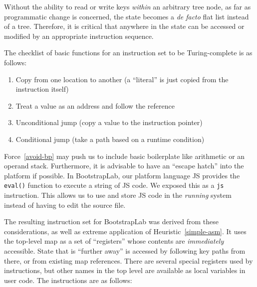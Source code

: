 \documentclass[ twoside,openright,titlepage,numbers=noenddot,headinclude,footinclude,cleardoublepage=empty,abstract=on,
                BCOR=5mm,paper=a4,fontsize=11pt
                ]{scrreprt}
\providecommand{\tightlist}{}\newenvironment{longtable}[2]{\begin{tabular}}{\end{tabular}}
\theoremstyle{definition}
\begin{document}
Without the ability to read or write keys \emph{within} an arbitrary
tree node, as far as programmatic change is concerned, the state becomes
a \emph{de facto} flat list instead of a tree. Therefore, it is critical
that anywhere in the state can be accessed or modified by an appropriate
instruction sequence.

The checklist of basic functions for an instruction set to be
Turing-complete is as follows:

\begin{enumerate}
\def\labelenumi{\arabic{enumi}.}
\tightlist
\item
  Copy from one location to another (a ``literal'' is just copied from
  the instruction itself)
\item
  Treat a value as an address and follow the reference
\item
  Unconditional jump (copy a value to the instruction pointer)
\item
  Conditional jump (take a path based on a runtime condition)
\end{enumerate}

Force~\ref{avoid-bp} may push us to include basic boilerplate like
arithmetic or an operand stack. Furthermore, it is advisable to have an
``escape hatch'' into the platform if possible. In BootstrapLab, our
platform language \ac{JS} provides the \texttt{eval()} function to
execute a string of \ac{JS} code. We exposed this as a \texttt{js}
instruction. This allows us to use and store \ac{JS} code in the
\emph{running} system instead of having to edit the source file.

The resulting instruction set for BootstrapLab was derived from these
considerations, as well as extreme application of
Heuristic~\ref{simple-asm}. It uses the top-level map as a set of
``registers'' whose contents are \emph{immediately} accessible. State
that is ``further away'' is accessed by following key paths from there,
or from existing map references. There are several special registers
used by instructions, but other names in the top level are available as
local variables in user code. The instructions are as follows:
\end{document}
